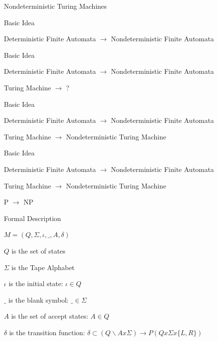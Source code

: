 \documentclass[presentation]{beamer}
\begin{document}
\begin{frame}[label={sec:org950a81c}]{Nondeterministic Turing Machines}
\begin{block}{Basic Idea}
\begin{block}{Deterministic Finite Automata \(\rightarrow\) Nondeterministic Finite Automata}
\end{block}
\end{block}
\begin{block}{Basic Idea}
\begin{block}{Deterministic Finite Automata \(\rightarrow\) Nondeterministic Finite Automata}
\end{block}
\begin{block}{Turing Machine \(\rightarrow\) ?}
\end{block}
\end{block}
\begin{block}{Basic Idea}
\begin{block}{Deterministic Finite Automata \(\rightarrow\) Nondeterministic Finite Automata}
\end{block}
\begin{block}{Turing Machine \(\rightarrow\) Nondeterministic Turing Machine}
\end{block}
\end{block}
\begin{block}{Basic Idea}
\begin{block}{Deterministic Finite Automata \(\rightarrow\) Nondeterministic Finite Automata}
\end{block}
\begin{block}{Turing Machine \(\rightarrow\) Nondeterministic Turing Machine}
\end{block}
\begin{block}{P \(\rightarrow\) NP}
\end{block}
\end{block}
\begin{block}{Formal Description}
\begin{block}{\(M = (Q,\Sigma,\iota,\_,A,\delta)\)}
\begin{block}{\(Q\) is the set of states}
\end{block}
\begin{block}{\(\Sigma\) is the Tape Alphabet}
\end{block}
\begin{block}{\(\iota\) is the initial state: \(\iota \in Q\)}
\end{block}
\begin{block}{\(\_\) is the blank symbol: \(\_ \in \Sigma\)}
\end{block}
\begin{block}{\(A\) is the set of accept states: \(A \in Q\)}
\end{block}
\begin{block}{\(\delta\) is the transition function: \(\delta \subset (Q \backslash A x \Sigma) \rightarrow P(Q x \Sigma x \{L,R\})\)}
\end{block}
\end{block}
\end{block}


\end{frame}
\end{document}
